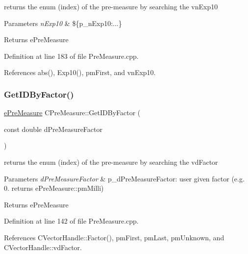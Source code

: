 returns the enum (index) of the pre-\/measure by searching the vn\+Exp10 


\begin{DoxyParams}{Parameters}
{\em n\+Exp10} & \$\{p\+\_\+n\+Exp10\+:...\} \\
\hline
\end{DoxyParams}
\begin{DoxyReturn}{Returns}
e\+Pre\+Measure 
\end{DoxyReturn}


Definition at line 183 of file Pre\+Measure.\+cpp.



References abs(), Exp10(), pm\+First, and vn\+Exp10.

\mbox{\label{classCPreMeasure_a90984e3bfb9676fca033289504d10219}} 
\subsubsection{\texorpdfstring{Get\+I\+D\+By\+Factor()}{GetIDByFactor()}}
{\footnotesize\ttfamily \hyperlink{PreMeasure_8h_a6c81167b8d4c2badde42f81cb7214620}{e\+Pre\+Measure} C\+Pre\+Measure\+::\+Get\+I\+D\+By\+Factor (\begin{DoxyParamCaption}\item[{const double}]{d\+Pre\+Measure\+Factor }\end{DoxyParamCaption})}



returns the enum (index) of the pre-\/measure by searching the vd\+Factor 


\begin{DoxyParams}{Parameters}
{\em d\+Pre\+Measure\+Factor} & p\+\_\+d\+Pre\+Measure\+Factor\+: user given factor (e.\+g. 0. returns e\+Pre\+Measure\+::pm\+Milli) \\
\hline
\end{DoxyParams}
\begin{DoxyReturn}{Returns}
e\+Pre\+Measure 
\end{DoxyReturn}


Definition at line 142 of file Pre\+Measure.\+cpp.



References C\+Vector\+Handle\+::\+Factor(), pm\+First, pm\+Last, pm\+Unknown, and C\+Vector\+Handle\+::vd\+Factor.

